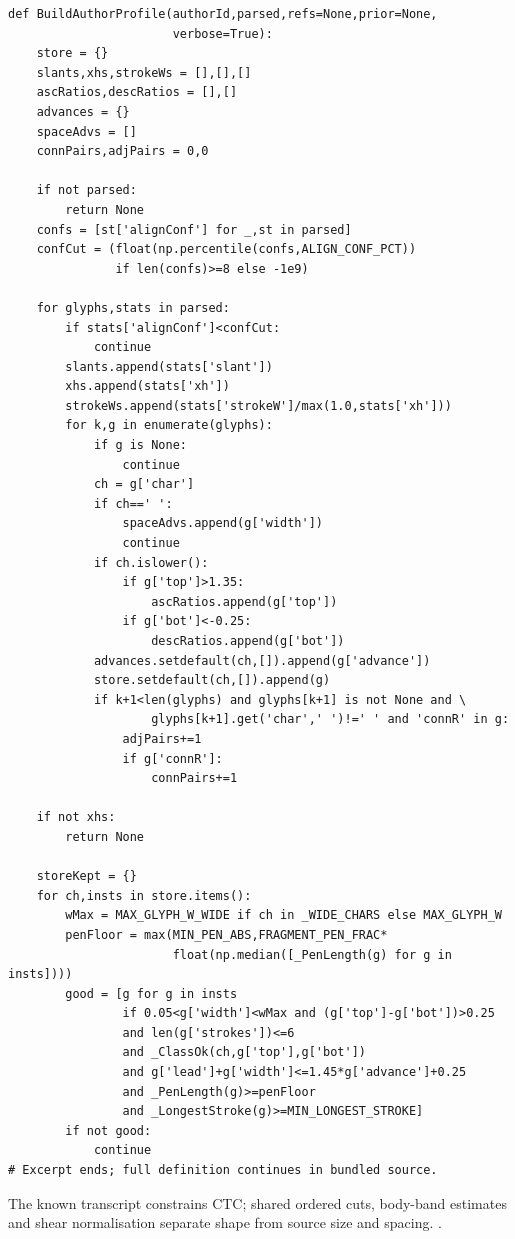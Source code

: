 \begin{lstlisting}[style=plain]
def BuildAuthorProfile(authorId,parsed,refs=None,prior=None,
                       verbose=True):
    store = {}
    slants,xhs,strokeWs = [],[],[]
    ascRatios,descRatios = [],[]
    advances = {}
    spaceAdvs = []
    connPairs,adjPairs = 0,0

    if not parsed:
        return None
    confs = [st['alignConf'] for _,st in parsed]
    confCut = (float(np.percentile(confs,ALIGN_CONF_PCT))
               if len(confs)>=8 else -1e9)

    for glyphs,stats in parsed:
        if stats['alignConf']<confCut:
            continue
        slants.append(stats['slant'])
        xhs.append(stats['xh'])
        strokeWs.append(stats['strokeW']/max(1.0,stats['xh']))
        for k,g in enumerate(glyphs):
            if g is None:
                continue
            ch = g['char']
            if ch==' ':
                spaceAdvs.append(g['width'])
                continue
            if ch.islower():
                if g['top']>1.35:
                    ascRatios.append(g['top'])
                if g['bot']<-0.25:
                    descRatios.append(g['bot'])
            advances.setdefault(ch,[]).append(g['advance'])
            store.setdefault(ch,[]).append(g)
            if k+1<len(glyphs) and glyphs[k+1] is not None and \
                    glyphs[k+1].get('char',' ')!=' ' and 'connR' in g:
                adjPairs+=1
                if g['connR']:
                    connPairs+=1

    if not xhs:
        return None

    storeKept = {}
    for ch,insts in store.items():
        wMax = MAX_GLYPH_W_WIDE if ch in _WIDE_CHARS else MAX_GLYPH_W
        penFloor = max(MIN_PEN_ABS,FRAGMENT_PEN_FRAC*
                       float(np.median([_PenLength(g) for g in insts])))
        good = [g for g in insts
                if 0.05<g['width']<wMax and (g['top']-g['bot'])>0.25
                and len(g['strokes'])<=6
                and _ClassOk(ch,g['top'],g['bot'])
                and g['lead']+g['width']<=1.45*g['advance']+0.25
                and _PenLength(g)>=penFloor
                and _LongestStroke(g)>=MIN_LONGEST_STROKE]
        if not good:
            continue
# Excerpt ends; full definition continues in bundled source.
\end{lstlisting}
The known transcript constrains CTC; shared ordered cuts, body-band estimates and shear normalisation separate shape from source size and spacing. \cite{graves2006,vinciarelli2001,code2026}.



